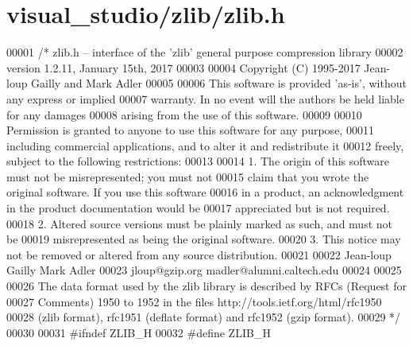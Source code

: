 \hypertarget{visual__studio_2zlib_2zlib_8h_source}{}\section{visual\+\_\+studio/zlib/zlib.h}
\label{visual__studio_2zlib_2zlib_8h_source}

\begin{DoxyCode}
00001 \textcolor{comment}{/* zlib.h -- interface of the 'zlib' general purpose compression library}
00002 \textcolor{comment}{  version 1.2.11, January 15th, 2017}
00003 \textcolor{comment}{}
00004 \textcolor{comment}{  Copyright (C) 1995-2017 Jean-loup Gailly and Mark Adler}
00005 \textcolor{comment}{}
00006 \textcolor{comment}{  This software is provided 'as-is', without any express or implied}
00007 \textcolor{comment}{  warranty.  In no event will the authors be held liable for any damages}
00008 \textcolor{comment}{  arising from the use of this software.}
00009 \textcolor{comment}{}
00010 \textcolor{comment}{  Permission is granted to anyone to use this software for any purpose,}
00011 \textcolor{comment}{  including commercial applications, and to alter it and redistribute it}
00012 \textcolor{comment}{  freely, subject to the following restrictions:}
00013 \textcolor{comment}{}
00014 \textcolor{comment}{  1. The origin of this software must not be misrepresented; you must not}
00015 \textcolor{comment}{     claim that you wrote the original software. If you use this software}
00016 \textcolor{comment}{     in a product, an acknowledgment in the product documentation would be}
00017 \textcolor{comment}{     appreciated but is not required.}
00018 \textcolor{comment}{  2. Altered source versions must be plainly marked as such, and must not be}
00019 \textcolor{comment}{     misrepresented as being the original software.}
00020 \textcolor{comment}{  3. This notice may not be removed or altered from any source distribution.}
00021 \textcolor{comment}{}
00022 \textcolor{comment}{  Jean-loup Gailly        Mark Adler}
00023 \textcolor{comment}{  jloup@gzip.org          madler@alumni.caltech.edu}
00024 \textcolor{comment}{}
00025 \textcolor{comment}{}
00026 \textcolor{comment}{  The data format used by the zlib library is described by RFCs (Request for}
00027 \textcolor{comment}{  Comments) 1950 to 1952 in the files http://tools.ietf.org/html/rfc1950}
00028 \textcolor{comment}{  (zlib format), rfc1951 (deflate format) and rfc1952 (gzip format).}
00029 \textcolor{comment}{*/}
00030 
00031 \textcolor{preprocessor}{#ifndef ZLIB\_H}
00032 \textcolor{preprocessor}{#define ZLIB\_H}

\end{DoxyCode}
